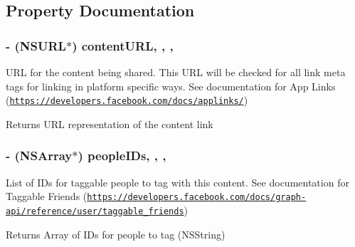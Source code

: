 \subsection{Property Documentation}
\hypertarget{protocol_f_b_s_d_k_sharing_content-p_af1a334ad35323e1f865fd46b6c30f0c8}{
\subsubsection[{content\-U\-R\-L}]{\setlength{\rightskip}{0pt plus 5cm}-\/ (N\-S\-U\-R\-L$\ast$) content\-U\-R\-L\hspace{0.3cm}{\ttfamily [read]}, {\ttfamily [write]}, {\ttfamily [nonatomic]}, {\ttfamily [copy]}}}\label{protocol_f_b_s_d_k_sharing_content-p_af1a334ad35323e1f865fd46b6c30f0c8}
U\-R\-L for the content being shared.  This U\-R\-L will be checked for all link meta tags for linking in platform specific ways. See documentation for App Links (\href{https://developers.facebook.com/docs/applinks/}{\tt https\-://developers.\-facebook.\-com/docs/applinks/}) \begin{DoxyReturn}{Returns}
U\-R\-L representation of the content link 
\end{DoxyReturn}
\hypertarget{protocol_f_b_s_d_k_sharing_content-p_a07031f755deb87e88a8c0765c9d6651d}{
\subsubsection[{people\-I\-Ds}]{\setlength{\rightskip}{0pt plus 5cm}-\/ (N\-S\-Array$\ast$) people\-I\-Ds\hspace{0.3cm}{\ttfamily [read]}, {\ttfamily [write]}, {\ttfamily [nonatomic]}, {\ttfamily [copy]}}}\label{protocol_f_b_s_d_k_sharing_content-p_a07031f755deb87e88a8c0765c9d6651d}
List of I\-Ds for taggable people to tag with this content.  See documentation for Taggable Friends (\href{https://developers.facebook.com/docs/graph-api/reference/user/taggable_friends}{\tt https\-://developers.\-facebook.\-com/docs/graph-\/api/reference/user/taggable\-\_\-friends}) \begin{DoxyReturn}{Returns}
Array of I\-Ds for people to tag (N\-S\-String) 
\end{DoxyReturn}
